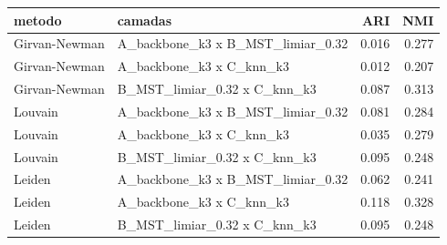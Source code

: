 \begin{tabular}{llrr}
\toprule
metodo & camadas & ARI & NMI \\
\midrule
Girvan-Newman & A\_backbone\_k3 x B\_MST\_limiar\_0.32 & 0.016 & 0.277 \\
Girvan-Newman & A\_backbone\_k3 x C\_knn\_k3 & 0.012 & 0.207 \\
Girvan-Newman & B\_MST\_limiar\_0.32 x C\_knn\_k3 & 0.087 & 0.313 \\
Louvain & A\_backbone\_k3 x B\_MST\_limiar\_0.32 & 0.081 & 0.284 \\
Louvain & A\_backbone\_k3 x C\_knn\_k3 & 0.035 & 0.279 \\
Louvain & B\_MST\_limiar\_0.32 x C\_knn\_k3 & 0.095 & 0.248 \\
Leiden & A\_backbone\_k3 x B\_MST\_limiar\_0.32 & 0.062 & 0.241 \\
Leiden & A\_backbone\_k3 x C\_knn\_k3 & 0.118 & 0.328 \\
Leiden & B\_MST\_limiar\_0.32 x C\_knn\_k3 & 0.095 & 0.248 \\
\bottomrule
\end{tabular}
